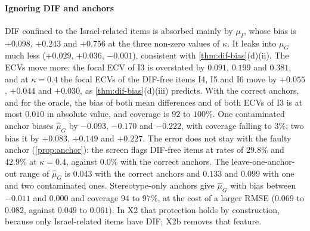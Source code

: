 \paragraph{Ignoring DIF and anchors}
DIF confined to the Israel-related items is absorbed mainly by $\mu_I$, whose bias is $+0.098$, $+0.243$ and $+0.756$ at the three non-zero values of $\kappa$. It leaks into $\mu_G$ much less ($+0.029$, $+0.036$, $-0.001$), consistent with \cref{thm:dif-bias}(d)(ii). The ECVs move more: the focal ECV of I3 is overstated by $0.091$, $0.199$ and $0.381$, and at $\kappa=0.4$ the focal ECVs of the DIF-free items I4, I5 and I6 move by $+0.055$, $+0.044$ and $+0.030$, as \cref{thm:dif-bias}(d)(iii) predicts. With the correct anchors, and for the oracle, the bias of both mean differences and of both ECVs of I3 is at most $0.010$ in absolute value, and coverage is $92$ to $100\%$. One contaminated anchor biases $\hat\mu_G$ by $-0.093$, $-0.170$ and $-0.222$, with coverage falling to $3\%$; two bias it by $+0.083$, $+0.149$ and $+0.227$. The error does not stay with the faulty anchor (\cref{prop:anchor}): the screen flags DIF-free items at rates of $29.8\%$ and $42.9\%$ at $\kappa=0.4$, against $0.0\%$ with the correct anchors. The leave-one-anchor-out range of $\hat\mu_G$ is $0.043$ with the correct anchors and $0.133$ and $0.099$ with one and two contaminated ones. Stereotype-only anchors give $\hat\mu_G$ with bias between $-0.011$ and $0.000$ and coverage $94$ to $97\%$, at the cost of a larger RMSE ($0.069$ to $0.082$, against $0.049$ to $0.061$). In X2 that protection holds by construction, because only Israel-related items have DIF; X2b removes that feature.

